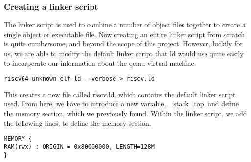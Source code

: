 \subsubsection{Creating a linker script}
The linker script is used to combine a number of object files together to create
a single object or executable file. Now creating an entire linker script from
scratch is quite cumbersome, and beyond the scope of this project. However,
luckily for us, we are able to modify the default linker script that ld would
use quite easily to
incorperate our information about the qemu virtual machine.
\begin{lstlisting}
riscv64-unknown-elf-ld --verbose > riscv.ld
\end{lstlisting}
This creates a new file called riscv.ld, which contains the default linker
script used. From here, we have to introduce a new variable, \_stack\_top, and
define the memory section, which we previously found. Within the linker script,
we add the following lines, to define the memory section.

\begin{lstlisting}
MEMORY {
RAM(rwx) : ORIGIN = 0x80000000, LENGTH=128M
}
\end{lstlisting}



